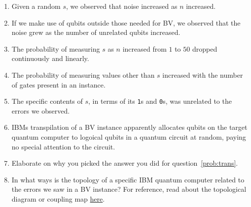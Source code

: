 \documentclass[12pt]{article}
\begin{document}
\begin{enumerate}
\begin{enumerate}[label=\theenumi.\arabic*]
    \item Given a random $s$, we observed that noise increased as $n$ increased. \TF{}
    \item If we make use of qubits outside those needed for BV, we observed that the noise grew as the number of unrelated qubits increased. \TF{}
    \item The probability of measuring $s$ as $n$ increased from $1$ to $50$ dropped continuously and linearly.\TF{}
    \item The probability of measuring values other than $s$ increased with the number of  gates present in an instance. \TF{}
    \item The specific contents of $s$, in terms of its \texttt{1}s and \texttt{0}s, was unrelated to the errors we observed.\TF{}
    \item\label{prob:trans} IBMs transpilation of a BV instance apparently allocates qubits on the target quantum computer to logoical qubits in a quantum circuit at random, paying no special attention to the circuit.\TF{}
    \item Elaborate on why you picked the answer you did for question~\ref{prob:trans}.
    \LeaveSpace{}
    \item In what ways is the topology of a specific IBM quantum computer related to the errors we saw in a BV instance?  For reference, read about the topological diagram or coupling map \href{https://quantum.cloud.ibm.com/docs/en/guides/qpu-information}{here}.
    \LeaveSpace{}
\end{enumerate}


\end{enumerate}
\end{document}
